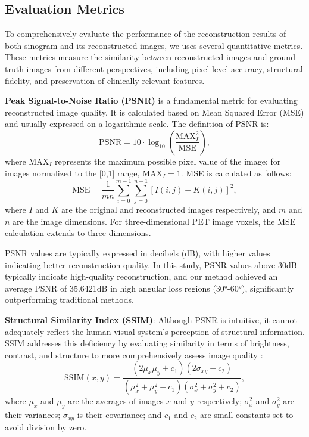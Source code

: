 \documentclass[
reprint,
superscriptaddress,
nofootinbib,
amsmath,amssymb,
aps,
prd,
]{revtex4-2}
\begin{document}
\subsection{Evaluation Metrics}

To comprehensively evaluate the performance of the reconstruction results of both sinogram and its reconstructed images, we uses several quantitative metrics. These metrics measure the similarity between reconstructed images and ground truth images from different perspectives, including pixel-level accuracy, structural fidelity, and preservation of clinically relevant features.


\textbf{Peak Signal-to-Noise Ratio (PSNR)} \cite{Hore2010PSNRvsSSIM} is a fundamental metric for evaluating reconstructed image quality. It is calculated based on Mean Squared Error (MSE) and usually expressed on a logarithmic scale. The definition of PSNR is:
\begin{equation}
\text{PSNR} = 10 \cdot \log_{10}\left(\frac{\text{MAX}_I^2}{\text{MSE}}\right),
\end{equation}
where $\text{MAX}_I$ represents the maximum possible pixel value of the image; for images normalized to the [0,1] range, $\text{MAX}_I = 1$. MSE is calculated as follows:
\begin{equation}
\text{MSE} = \frac{1}{mn}\sum_{i=0}^{m-1}\sum_{j=0}^{n-1}[I(i,j) - K(i,j)]^2,
\end{equation}
where $I$ and $K$ are the original and reconstructed images respectively, and $m$ and $n$ are the image dimensions. For three-dimensional PET image voxels, the MSE calculation extends to three dimensions.

PSNR values are typically expressed in decibels (dB), with higher values indicating better reconstruction quality. In this study, PSNR values above 30dB typically indicate high-quality reconstruction, and our method achieved an average PSNR of 35.6421dB in high angular loss regions (30°-60°), significantly outperforming traditional methods.

\textbf{Structural Similarity Index (SSIM)}: Although PSNR is intuitive, it cannot adequately reflect the human visual system's perception of structural information. SSIM addresses this deficiency by evaluating similarity in terms of brightness, contrast, and structure to more comprehensively assess image quality \cite{Wang2004SSIM}:
\begin{equation}
\text{SSIM}(x, y) = \frac{(2\mu_x\mu_y + c_1)(2\sigma_{xy} + c_2)}{(\mu_x^2 + \mu_y^2 + c_1)(\sigma_x^2 + \sigma_y^2 + c_2)},
\end{equation}
where $\mu_x$ and $\mu_y$ are the averages of images $x$ and $y$ respectively; $\sigma_x^2$ and $\sigma_y^2$ are their variances; $\sigma_{xy}$ is their covariance; and $c_1$ and $c_2$ are small constants set to avoid division by zero.
\end{document}
